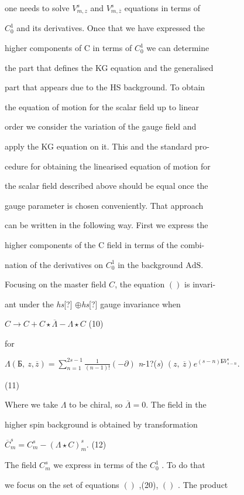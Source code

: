 \documentclass[a4paper,12pt]{article}
\begin{document}
one needs to solve $V_{m,z}^{s}$ and $V_{m,\overline{z}}^{s}$ equations in terms of

$C_{0}^{1}$ and its derivatives. Once that we have expressed the

higher components of $\mathrm{C}$ in terms of $C_{0}^{1}$ we can determine

the part that defines the KG equation and the generalised

part that appears due to the HS background. To obtain

the equation of motion for the scalar field up to linear

order we consider the variation of the gauge field and

apply the KG equation on it. This and the standard pro-

cedure for obtaining the linearised equation of motion for

the scalar field described above should be equal once the

gauge parameter is chosen conveniently. That approach

can be written in the following way. First we express the

higher components of the $\mathrm{C}$ field in terms of the combi-

nation of the derivatives on $C_{0}^{1}$ in the background $\mathrm{A}\mathrm{d}\mathrm{S}.$

Focusing on the master field $C$, the equation $()$ is invari-

ant under the {\it hs}[?] $\oplus${\it hs}[?] gauge invariance when
\begin{center}
$C\rightarrow C+C\star\overline{\Lambda}-\Lambda\star C$   (10)
\end{center}
for

$\displaystyle \Lambda(Б,\ z,\overline{z})=\sum_{n=1}^{2s-1}\frac{1}{(n-1)!} (-\partial)$ {\it n}-1?({\it s}) $(z,\ \overline{z})e^{(s-n)Б V_{s-n}^{s}}.$

(11)

Where we take $\Lambda$ to be chiral, so $\overline{\Lambda}=0$. The field in the

higher spin background is obtained by transformation
\begin{center}
$\overline{C}_{m}^{s}=C_{m}^{s}-(\Lambda\star C)_{m}^{s}$.   (12)
\end{center}
The field $C_{m}^{s}$ we express in terms of the $C_{0}^{1}$ . To do that

we focus on the set of equations $()$ ,(20), $()$ . The product
\end{document}
